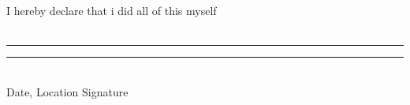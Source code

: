 I hereby declare that i did all of this myself\\\\
%

\begin{flushright}

\rule{3.5cm}{1pt} 
\qquad
\rule{3.5cm}{1pt} 
\hfill
\\
\hfill
\qquad 
Date, Location
\hspace{1.8cm}
Signature
\qquad \qquad

\end{flushright}